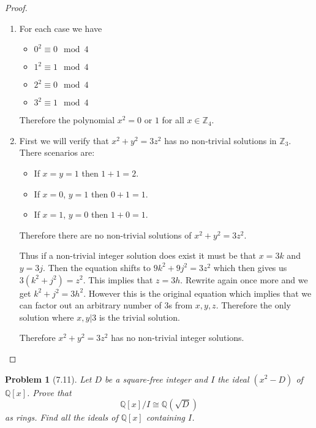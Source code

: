 \documentclass[10pt]{article}
\newcommand{\sk}{\vskip 10mm}
\newcommand{\bb}[1]{\mathbb{#1}}
\theoremstyle{plain}
\newtheorem{problem}{Problem}
\theoremstyle{remark}
\begin{document}
\begin{proof}
  \begin{enumerate}
  \item For each case we have
    \begin{itemize}
    \item $0^2\equiv 0 \mod 4$
    \item $1^2\equiv 1 \mod 4$
    \item $2^2\equiv 0 \mod 4$
    \item $3^2\equiv 1 \mod 4$
    \end{itemize}
    Therefore the polynomial $x^2=0$ or $1$ for all $x\in\bb{Z}_4$.
  \item First we will verify that $x^2+y^2=3z^2$ has no non-trivial solutions in
    $\bb{Z}_3$. There scenarios are:
    \begin{itemize}
    \item If $x=y=1$ then $1+1=2$.
    \item If $x=0$, $y=1$ then $0+1=1$.
    \item If $x=1$, $y=0$ then $1+0=1$.
    \end{itemize}
    Therefore there are no non-trivial solutions of $x^2+y^2=3z^2$.

    Thus if a non-trivial integer solution does exist it must be that $x=3k$ and $y=3j$.
    Then the equation shifts to $9k^2+9j^2=3z^2$ which then gives us
    $3(k^2+j^2)=z^2$. This implies that $z=3h$. Rewrite again once
    more and we get $k^2+j^2=3h^2$. However this is the original equation
    which implies that we can factor out an arbitrary number of $3$s from
    $x,y,z$. Therefore the only solution where $x,y|3$ is the trivial solution.

    Therefore $x^2+y^2=3z^2$ has no non-trivial integer solutions.
  \end{enumerate}
\end{proof}

\sk

\begin{problem}[7.11]
  Let $D$ be a square-free integer and $I$ the ideal $(x^2-D)$ of $\bb{Q}[x]$.
  Prove that
  \[ \bb{Q}[x]/I\cong\bb{Q}(\sqrt{D}) \]
  as rings. Find all the ideals of $\bb{Q}[x]$ containing $I$.
\end{problem}
\end{document}

